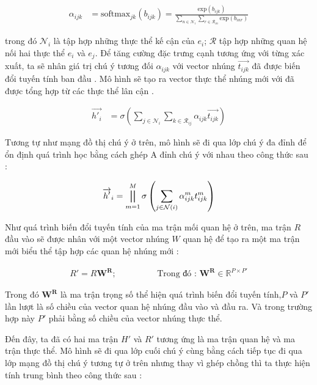 \begin{align}
{\alpha_{ijk}}&={\text{softmax}_{jk}(b_{ijk})} =\frac{\text{exp}(b_{ijk})}{\sum_{n\in \mathcal{N}_i} \sum_{r\in \mathcal{R}_{in}}\text{exp}(b_{inr})}
\end{align}

trong đó $\mathcal{N}_i$ là tập hợp những thực thể kế cận của $e_i$; $\mathcal{R}$ tập hợp những quan hệ nối hai thực thể $e_i$ và $e_j$. Để tăng cường đặc trưng cạnh tương ứng với từng xác xuất, ta sẽ nhân giá trị chú ý tương đối $\alpha_{ijk}$ với vector nhúng $\overrightarrow{t_{ijk}}$ đã được biến đổi tuyến tính ban đầu . Mô hình sẽ tạo ra vector thực thể nhúng mới với đã được tổng hợp từ các thực thể lân cận .

\begin{align}
{\overrightarrow{h'_{i}}}&={\sigma\left(\sum_{j \in \mathcal{N}_i} \sum_{k \in \mathcal{R}_{ij}} \alpha_{ijk} \overrightarrow{t_{ijk}}\right)}
\end{align}

Tương tự như mạng đồ thị chú ý ở trên, mô hình sẽ đi qua lớp chú ý đa đỉnh để ổn định quá trình học bằng cách ghép A đỉnh chú ý với nhau theo công thức sau :

\begin{align}
\overrightarrow{h'}_i=\bigparallel_{m=1}^{M} \sigma\left(\sum_{j\in \mathcal{N}(i)}\alpha_{ijk}^{m}t^{m}_{ijk}\right)
\end{align}

Như quá trình biến đổi tuyến tính của ma trận mối quan hệ ở trên, ma trận $R$ đầu vào sẽ được nhân với một vector nhúng $W$ quan hệ để tạo ra một ma trận mới biểu thể tập hợp các quan hệ nhúng mới :

\begin{align}
R' = R \mathbf{W^R}; \hspace{2cm} \text{Trong đó : } \mathbf{W^R} \in \mathbb{R}^{P \times P'}
\end{align}

Trong đó $\mathbf{W^R}$ là ma trận trọng số thể hiện quá trình biến đổi tuyến tính,$P$ và $P'$ lần lượt là số chiều của vector quan hệ nhúng đầu vào và đầu ra. Và trong trường hợp này  $P'$ phải bằng số chiều của vector nhúng thực thể.

Đến đây, ta đã có hai ma trận $H'$ và $R'$ tương ứng là ma trận quan hệ và ma trận thực thể. Mô hình sẽ đi qua lớp cuối chú ý cùng bằng cách tiếp tục đi qua lớp mạng đồ thị chú ý tương tự ở trên nhưng thay vì ghép chồng thì ta thực hiện tính trung bình theo công thức sau :

